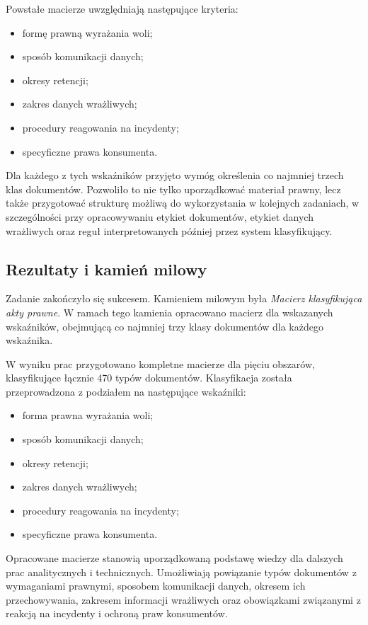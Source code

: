 \documentclass[12pt,a4paper]{report}
\begin{document}
Powstałe macierze uwzględniają następujące kryteria:

\begin{itemize}
    \item formę prawną wyrażania woli;
    \item sposób komunikacji danych;
    \item okresy retencji;
    \item zakres danych wrażliwych;
    \item procedury reagowania na incydenty;
    \item specyficzne prawa konsumenta.
\end{itemize}

Dla każdego z tych wskaźników przyjęto wymóg określenia co najmniej trzech klas dokumentów. Pozwoliło to nie tylko uporządkować materiał prawny, lecz także przygotować strukturę możliwą do wykorzystania w kolejnych zadaniach, w szczególności przy opracowywaniu etykiet dokumentów, etykiet danych wrażliwych oraz reguł interpretowanych później przez system klasyfikujący.

\subsection{Rezultaty i kamień milowy}
Zadanie zakończyło się sukcesem. Kamieniem milowym była \textit{Macierz klasyfikująca akty prawne}. W ramach tego kamienia opracowano macierz dla wskazanych wskaźników, obejmującą co najmniej trzy klasy dokumentów dla każdego wskaźnika.

W wyniku prac przygotowano kompletne macierze dla pięciu obszarów, klasyfikujące łącznie 470 typów dokumentów. Klasyfikacja została przeprowadzona z podziałem na następujące wskaźniki:

\begin{itemize}
    \item forma prawna wyrażania woli;
    \item sposób komunikacji danych;
    \item okresy retencji;
    \item zakres danych wrażliwych;
    \item procedury reagowania na incydenty;
    \item specyficzne prawa konsumenta.
\end{itemize}

Opracowane macierze stanowią uporządkowaną podstawę wiedzy dla dalszych prac analitycznych i technicznych. Umożliwiają powiązanie typów dokumentów z wymaganiami prawnymi, sposobem komunikacji danych, okresem ich przechowywania, zakresem informacji wrażliwych oraz obowiązkami związanymi z reakcją na incydenty i ochroną praw konsumentów.
\end{document}
